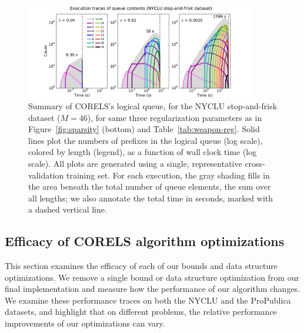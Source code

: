 \begin{figure}[t!]
\begin{center}
\includegraphics[trim={30mm 0mm 30mm 3mm},
width=0.9\textwidth]{figs/weapon_reg-queue.pdf}
\end{center}
\vspace{-5mm}
\caption{Summary of CORELS's logical queue,
for the NYCLU stop-and-frisk dataset (${M = 46}$),
for same three regularization parameters as in Figure~\ref{fig:sparsity} (bottom)
and Table~\ref{tab:weapon-reg}.
%
Solid lines plot the numbers of prefixes in the logical queue (log scale), colored by length (legend),
as a function of wall clock time (log scale).
%
All plots are generated using a single, representative cross-validation training set.
%
For each execution, the gray shading fills in the area beneath the total number
of queue elements, \ie the sum over all lengths;
we also annotate the total time in seconds, marked with a dashed vertical line.
}
\label{fig:queue-weapon-reg}
\end{figure}

\subsection{Efficacy of CORELS algorithm optimizations}
\label{sec:ablation}

This section examines the efficacy of each of our bounds and data structure optimizations.
%
We remove a single bound or data structure optimization from our final implementation and measure
how the performance of our algorithm changes.
%
We examine these performance traces on both the NYCLU and the ProPublica datasets,
and highlight that on different problems, the relative performance improvements of our optimizations can vary.

